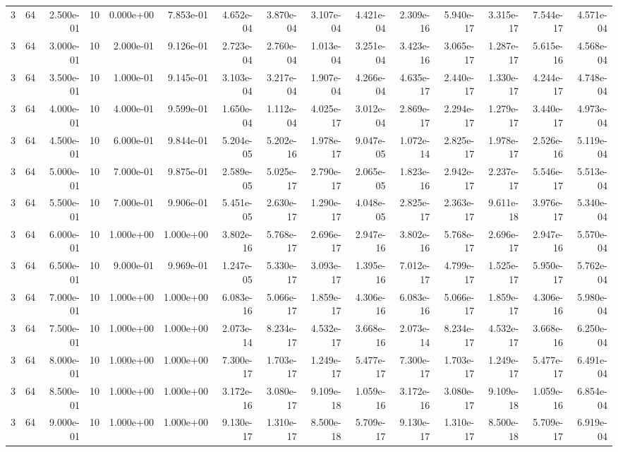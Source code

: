 \begin{tabular}{rrrrrrrrrrrrrrr}
3 & 64 & 2.500e-01 & 10 & 0.000e+00 & 7.853e-01 & 4.652e-04 & 3.870e-04 & 3.107e-04 & 4.421e-04 & 2.309e-16 & 5.940e-17 & 3.315e-17 & 7.544e-17 & 4.571e-04 \\
3 & 64 & 3.000e-01 & 10 & 2.000e-01 & 9.126e-01 & 2.723e-04 & 2.760e-04 & 1.013e-04 & 3.251e-04 & 3.423e-16 & 3.065e-17 & 1.287e-17 & 5.615e-16 & 4.568e-04 \\
3 & 64 & 3.500e-01 & 10 & 1.000e-01 & 9.145e-01 & 3.103e-04 & 3.217e-04 & 1.907e-04 & 4.266e-04 & 4.635e-17 & 2.440e-17 & 1.330e-17 & 4.244e-17 & 4.748e-04 \\
3 & 64 & 4.000e-01 & 10 & 4.000e-01 & 9.599e-01 & 1.650e-04 & 1.112e-04 & 4.025e-17 & 3.012e-04 & 2.869e-17 & 2.294e-17 & 1.279e-17 & 3.440e-17 & 4.973e-04 \\
3 & 64 & 4.500e-01 & 10 & 6.000e-01 & 9.844e-01 & 5.204e-05 & 5.202e-16 & 1.978e-17 & 9.047e-05 & 1.072e-14 & 2.825e-17 & 1.978e-17 & 2.526e-16 & 5.119e-04 \\
3 & 64 & 5.000e-01 & 10 & 7.000e-01 & 9.875e-01 & 2.589e-05 & 5.025e-17 & 2.790e-17 & 2.065e-05 & 1.823e-16 & 2.942e-17 & 2.237e-17 & 5.546e-17 & 5.513e-04 \\
3 & 64 & 5.500e-01 & 10 & 7.000e-01 & 9.906e-01 & 5.451e-05 & 2.630e-17 & 1.290e-17 & 4.048e-05 & 2.825e-17 & 2.363e-17 & 9.611e-18 & 3.976e-17 & 5.340e-04 \\
3 & 64 & 6.000e-01 & 10 & 1.000e+00 & 1.000e+00 & 3.802e-16 & 5.768e-17 & 2.696e-17 & 2.947e-16 & 3.802e-16 & 5.768e-17 & 2.696e-17 & 2.947e-16 & 5.570e-04 \\
3 & 64 & 6.500e-01 & 10 & 9.000e-01 & 9.969e-01 & 1.247e-05 & 5.330e-17 & 3.093e-17 & 1.395e-16 & 7.012e-17 & 4.799e-17 & 1.525e-17 & 5.950e-17 & 5.762e-04 \\
3 & 64 & 7.000e-01 & 10 & 1.000e+00 & 1.000e+00 & 6.083e-16 & 5.066e-17 & 1.859e-17 & 4.306e-16 & 6.083e-16 & 5.066e-17 & 1.859e-17 & 4.306e-16 & 5.980e-04 \\
3 & 64 & 7.500e-01 & 10 & 1.000e+00 & 1.000e+00 & 2.073e-14 & 8.234e-17 & 4.532e-17 & 3.668e-16 & 2.073e-14 & 8.234e-17 & 4.532e-17 & 3.668e-16 & 6.250e-04 \\
3 & 64 & 8.000e-01 & 10 & 1.000e+00 & 1.000e+00 & 7.300e-17 & 1.703e-17 & 1.249e-17 & 5.477e-17 & 7.300e-17 & 1.703e-17 & 1.249e-17 & 5.477e-17 & 6.491e-04 \\
3 & 64 & 8.500e-01 & 10 & 1.000e+00 & 1.000e+00 & 3.172e-16 & 3.080e-17 & 9.109e-18 & 1.059e-16 & 3.172e-16 & 3.080e-17 & 9.109e-18 & 1.059e-16 & 6.854e-04 \\
3 & 64 & 9.000e-01 & 10 & 1.000e+00 & 1.000e+00 & 9.130e-17 & 1.310e-17 & 8.500e-18 & 5.709e-17 & 9.130e-17 & 1.310e-17 & 8.500e-18 & 5.709e-17 & 6.919e-04 \\

\end{tabular}
